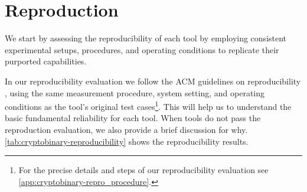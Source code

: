 \section{Reproduction}
\label{sec:cryptobinary-reproduction}

We start by assessing the reproducibility of each tool by employing consistent experimental setups, procedures, and operating conditions to replicate their purported capabilities. 

In our reproducibility evaluation we follow the ACM guidelines on reproducibility \cite{rar}, using the same measurement procedure, system setting, and operating conditions as the tool's original test cases\footnote{For the precise details and steps of our reproducibility evaluation see \autoref{app:cryptobinary-repro_procedure}.}. This will help us to understand the basic fundamental reliability for each tool.  When tools do not pass the reproduction evaluation, we also provide a brief discussion for why.
\autoref{tab:cryptobinary-reproducibility} shows the reproducibility results.

